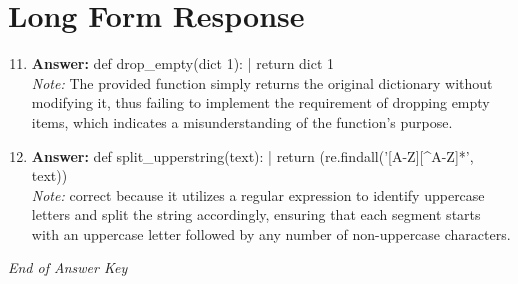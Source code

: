 \documentclass[12pt]{article}
\begin{document}
\section*{Long Form Response}
\begin{enumerate}[label=\arabic*.]
\setcounter{enumi}{10}
\item \textbf{Answer:} def drop\_empty(dict 1): | return dict 1
\\ \textit{Note:} The provided function simply returns the original dictionary without modifying it, thus failing to implement the requirement of dropping empty items, which indicates a misunderstanding of the function's purpose.
\item \textbf{Answer:} def split\_upperstring(text): | return (re.findall('[A-Z][^A-Z]*', text))
\\ \textit{Note:} correct because it utilizes a regular expression to identify uppercase letters and split the string accordingly, ensuring that each segment starts with an uppercase letter followed by any number of non-uppercase characters.
\end{enumerate}

\vfill
\noindent\textit{End of Answer Key}
\end{document}
